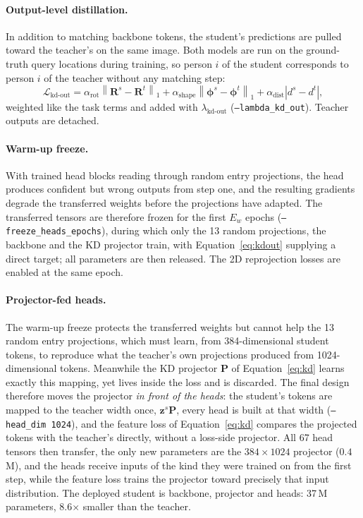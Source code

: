 \paragraph{Output-level distillation.} In addition to matching backbone
tokens, the student's predictions are pulled toward the teacher's on the same
image. Both models are run on the ground-truth query locations during
training, so person $i$ of the student corresponds to person $i$ of the
teacher without any matching step:
\begin{equation}
\mathcal{L}_{\text{kd-out}} = \alpha_{\text{rot}}\left\|\mathbf{R}^{s}-\mathbf{R}^{t}\right\|_1
 + \alpha_{\text{shape}}\left\|\boldsymbol{\phi}^{s}-\boldsymbol{\phi}^{t}\right\|_1
 + \alpha_{\text{dist}}\left|d^{s}-d^{t}\right| ,
\label{eq:kdout}
\end{equation}
weighted like the task terms and added with $\lambda_{\text{kd-out}}$
(\texttt{--lambda\_kd\_out}). Teacher outputs are detached.

\paragraph{Warm-up freeze.} With trained head blocks reading through random
entry projections, the head produces confident but wrong outputs from step
one, and the resulting gradients degrade the transferred weights before the
projections have adapted. The transferred tensors are therefore frozen for the
first $E_w$ epochs (\texttt{--freeze\_heads\_epochs}), during which only the 13
random projections, the backbone and the KD projector train, with
Equation~\ref{eq:kdout} supplying a direct target; all parameters are then
released. The 2D reprojection losses are enabled at the same epoch.


\paragraph{Projector-fed heads.} The warm-up freeze protects the transferred
weights but cannot help the 13 random entry projections, which must learn, from
384-dimensional student tokens, to reproduce what the teacher's own projections
produced from 1024-dimensional tokens. Meanwhile the KD projector $\mathbf{P}$
of Equation~\ref{eq:kd} learns exactly this mapping, yet lives inside the loss
and is discarded. The final design therefore moves the projector \emph{in front
of the heads}: the student's tokens are mapped to the teacher width once,
$\mathbf{z}^{s}\mathbf{P}$, every head is built at that width
(\texttt{--head\_dim 1024}), and the feature loss of Equation~\ref{eq:kd}
compares the projected tokens with the teacher's directly, without a
loss-side projector. All 67 head tensors then transfer, the only new parameters
are the $384{\times}1024$ projector ($0.4$\,M), and the heads receive inputs of
the kind they were trained on from the first step, while the feature loss
trains the projector toward precisely that input distribution. The deployed
student is backbone, projector and heads: 37\,M parameters, 8.6$\times$ smaller
than the teacher.


